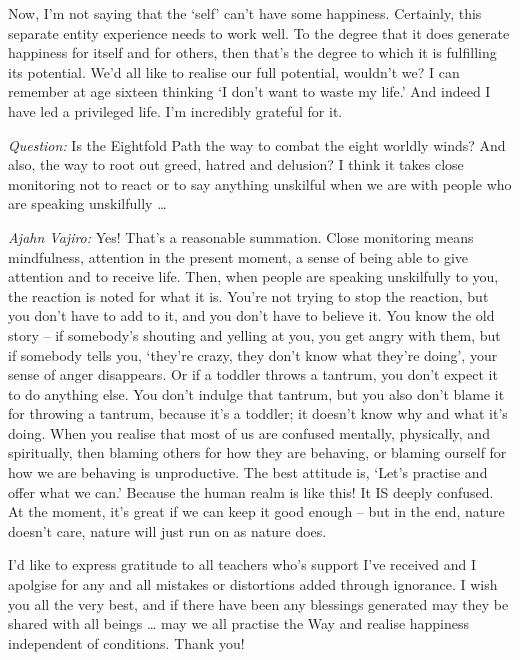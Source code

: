 \enlargethispage{\baselineskip}

Now, I'm not saying that the `self' can't have some happiness. Certainly, this
separate entity experience needs to work well. To the degree that it does
generate happiness for itself and for others, then that's the degree to which it
is fulfilling its potential. We'd all like to realise our full potential,
wouldn't we? I can remember at age sixteen thinking `I don't want to waste my
life.' And indeed I have led a privileged life. I'm incredibly grateful for it.

\emph{Question:} Is the Eightfold Path the way to combat the eight worldly winds? And
also, the way to root out greed, hatred and delusion? I think it takes close
monitoring not to react or to say anything unskilful when we are with people who
are speaking unskilfully \ldots{}

\emph{Ajahn Vajiro:} Yes! That's a reasonable summation. Close monitoring means
mindfulness, attention in the present moment, a sense of being able to give
attention and to receive life. Then, when people are speaking unskilfully to
you, the reaction is noted for what it is. You're not trying to stop the
reaction, but you don't have to add to it, and you don't have to believe it. You
know the old story -- if somebody's shouting and yelling at you, you get angry
with them, but if somebody tells you, `they're crazy, they don't know what
they're doing', your sense of anger disappears. Or if a toddler throws a
tantrum, you don't expect it to do anything else. You don't indulge that
tantrum, but you also don't blame it for throwing a tantrum, because it's a
toddler; it doesn't know why and what it's doing. When you realise that most of
us are confused mentally, physically, and spiritually, then blaming others for
how they are behaving, or blaming ourself for how we are behaving is
unproductive. The best attitude is, `Let's practise and offer what we can.'
Because the human realm is like this! It IS deeply confused. At the moment, it's
great if we can keep it good enough -- but in the end, nature doesn't care,
nature will just run on as nature does.

I'd like to express gratitude to all teachers who's support I've received and I apolgise for any and all mistakes or distortions added through ignorance.
I wish you all the very best, and if there have been any blessings generated
may they be shared with all beings \ldots{} may we all practise the Way and
realise happiness independent of conditions. Thank you!

